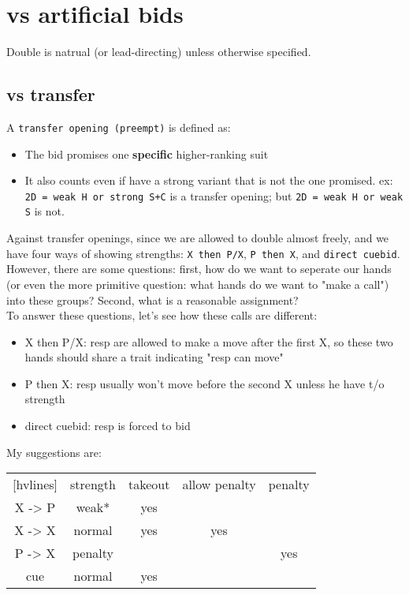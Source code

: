 \section{vs artificial bids}

Double is natrual (or lead-directing) unless otherwise specified.

\subsection{vs transfer}

A \texttt{transfer opening (preempt)} is defined as:

\begin{itemize}
    \setlength{\itemsep}{0pt}
    \item The bid promises one \textbf{specific} higher-ranking suit
    \item It also counts even if have a strong variant that is not the one promised. ex: \texttt{2D = weak H or strong S+C} is a transfer opening; but \texttt{2D = weak H or weak S} is not.
\end{itemize}

Against transfer openings, since we are allowed to double almost freely, and we have four ways of showing strengths: \texttt{X then P/X}, \texttt{P then X}, and \texttt{direct cuebid}.
However, there are some questions: first, how do we want to seperate our hands (or even the more primitive question: what hands do we want to "make a call") into these groups?
Second, what is a reasonable assignment? \\
To answer these questions, let's see how these calls are different:
\begin{itemize}
    \setlength{\itemsep}{0pt}
    \item X then P/X: resp are allowed to make a move after the first X, so these two hands should share a trait indicating "resp can move"
    \item P then X: resp usually won't move before the second X unless he have t/o strength
    \item direct cuebid: resp is forced to bid
\end{itemize}

My suggestions are:

{\small\ttfamily
\begin{NiceTabular}{ccccc}[hvlines]
       & strength & takeout & allow penalty & penalty \\
X -> P & weak*    & yes     &               &         \\
X -> X & normal   & yes     & yes           &         \\
P -> X & penalty  &         &               & yes     \\
cue    & normal   & yes     &               &         \\
\end{NiceTabular}}

